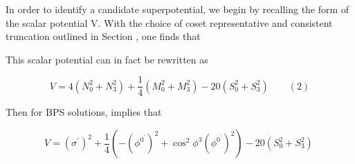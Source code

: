 \documentclass{article}
\begin{document}
In order to identify a candidate superpotential, we begin by recalling the form of the scalar
potential V. With the choice of coset representative and consistent truncation outlined in
Section , one finds that


This scalar potential can in fact be rewritten as


\begin{equation}
V = 4 ( N _ { 0 } ^ { 2 } + N _ { 3 } ^ { 2 } ) + \frac { 1 } { 4 } ( M _ { 0 } ^ { 2 } + M _ { 3 } ^ { 2 } ) - 2 0 ( S _ { 0 } ^ { 2 } + S _ { 3 } ^ { 2 } ) \qquad ( 2 )
\end{equation}


Then for BPS solutions, implies that


\begin{equation}
V = ( \sigma ^ { \prime } ) ^ { 2 } + \frac { 1 } { 4 } \left ( - ( \phi ^ { 0 ^ { \prime } } ) ^ { 2 } + \cos ^ { 2 } \phi ^ { 3 } ( \phi ^ { 0 ^ { \prime } } ) ^ { 2 } \right ) - 2 0 ( S _ { 0 } ^ { 2 } + S _ { 3 } ^ { 2 } ) ~
\end{equation}
\end{document}
